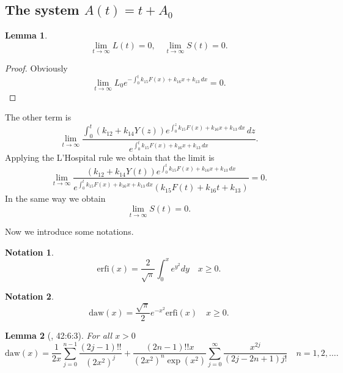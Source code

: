 \documentclass[pdflatex,sn-mathphys-num]{sn-jnl}
\theoremstyle{thmstyleone}
\newtheorem{lemma}{Lemma}[section]
\theoremstyle{thmstyletwo}
\theoremstyle{thmstylethree}
\newtheorem{notation}{Notation}[section]
\begin{document}
\subsection{\texorpdfstring{The system $A(t)=t+A_0$}{The system A(t)=t+A0}}

\begin{lemma}\label{lem:lim L S}
\begin{equation*}
     \lim_{t\to\infty}L(t)=0,\quad \lim_{t\to\infty}S(t)=0. 
\end{equation*}
\end{lemma}
\begin{proof}
Obviously
\begin{equation*}
\lim_{t\to\infty} L_0 e^{-\int_0^t k_{15}F(x)+k_{16}x+k_{13} \, dx}=0.
\end{equation*}
\end{proof}
The other term is
\begin{equation*}
\lim_{t\to\infty}
\frac{\int_0^t \left( k_{12} + k_{14}Y(z) \right) 
e^{\int_0^z k_{15}F(x)+k_{16}x+k_{13} \, dx} \, dz }
{e^{\int_0^t k_{15}F(x)+k_{16}x+k_{13} \, dx}}. 
\end{equation*}
Applying the L’Hospital rule we obtain that the limit is
\begin{equation*}
\lim_{t\to\infty}
\frac{\left( k_{12} + k_{14}Y(t) \right) 
e^{\int_0^t k_{15}F(x)+k_{16}x+k_{13} \, dx}}
{e^{\int_0^t k_{15}F(x)+k_{16}x+k_{13} \, dx} (k_{15}F(t)+k_{16}t+k_{13})} =0.
\end{equation*}
In the same way we obtain
\begin{equation*}
\lim_{t\to\infty} S(t)=0.
\end{equation*}

Now we introduce some notations.
\begin{notation}
\begin{equation}
\mathrm{erfi}(x)=\frac{2}{\sqrt{\pi}}\int_0^x e^{y^2}dy
\quad x\geq 0.
\end{equation}
\end{notation}
\begin{notation}
\begin{equation}
\mathrm{daw}(x)=\frac{\sqrt{\pi}}{2}e^{-x^2}\mathrm{erfi}(x)
\quad x\geq 0.
\end{equation}
\end{notation}
\begin{lemma}[\cite{AtlasOfFunctions}, 42:6:3] For all $x>0$ 
\begin{equation}
\mathrm{daw}(x)=\frac{1}{2x}\sum_{j=0}^{n-1}\frac{(2j-1)!!}{(2x^2)^j}
+\frac{(2n-1)!!x}{(2x^2)^n \exp(x^2)}\sum_{j=0}^{\infty} 
\frac{x^{2j}}{(2j-2n+1)j!}\quad n=1,2,\ldots.
\end{equation}
\end{lemma}
\end{document}
